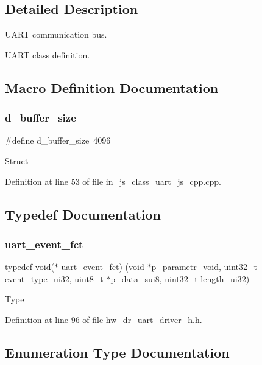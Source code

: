 \subsection{Detailed Description}
U\+A\+RT communication bus. 

U\+A\+RT class definition.

\subsection{Macro Definition Documentation}
\mbox{\label{group___u_a_r_t_ga8c96cc9b53c76c39830354bb412ff059}} 
\subsubsection{d\_buffer\_size}
{\footnotesize\ttfamily \#define d\+\_\+buffer\+\_\+size~4096}

Struct 

Definition at line 53 of file in\+\_\+js\+\_\+class\+\_\+uart\+\_\+js\+\_\+cpp.\+cpp.



\subsection{Typedef Documentation}
\mbox{\label{group___u_a_r_t_ga8f6a90ddf5e09014f2707f38c5f8ff28}} 
\subsubsection{uart\_event\_fct}
{\footnotesize\ttfamily typedef void($\ast$ uart\+\_\+event\+\_\+fct) (void $\ast$p\+\_\+parametr\+\_\+void, uint32\+\_\+t event\+\_\+type\+\_\+ui32, uint8\+\_\+t $\ast$p\+\_\+data\+\_\+sui8, uint32\+\_\+t length\+\_\+ui32)}

Type 

Definition at line 96 of file hw\+\_\+dr\+\_\+uart\+\_\+driver\+\_\+h.\+h.



\subsection{Enumeration Type Documentation}
\mbox{\label{group___u_a_r_t_gab7285632f807ad04f00f44a206440a18}} 
